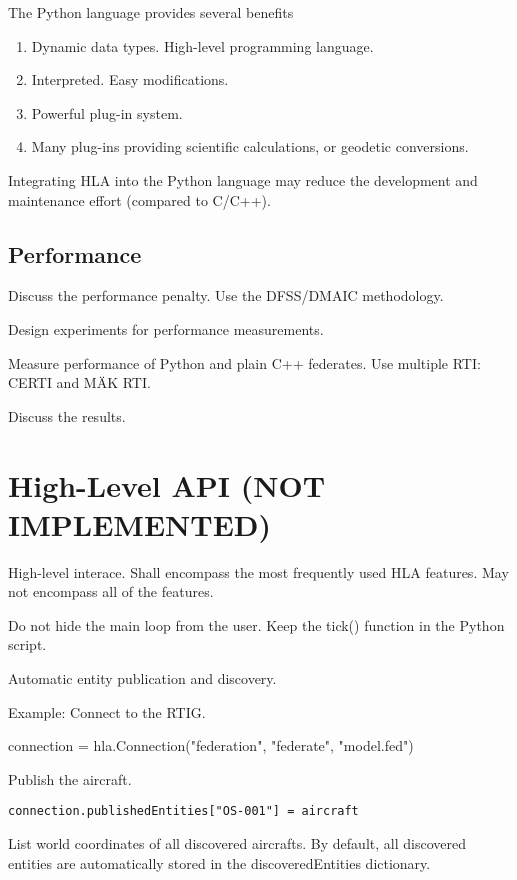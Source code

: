 \documentclass{howto}
\begin{document}
The Python language provides several benefits
\begin{enumerate}
\item Dynamic data types. High-level programming language.
\item Interpreted. Easy modifications.
\item Powerful plug-in system.
\item Many plug-ins providing scientific calculations, or geodetic conversions.
\end{enumerate}

Integrating HLA into the Python language may reduce the development and
maintenance effort (compared to C/C++).

\subsection{Performance}

Discuss the performance penalty. Use the DFSS/DMAIC methodology.

Design experiments for performance measurements.

Measure performance of Python and plain C++ federates. Use multiple RTI: CERTI and MÄK RTI.

Discuss the results.




\section{High-Level API (NOT IMPLEMENTED)}
High-level interace. Shall encompass the most frequently used HLA features. May not encompass all of the features.

Do not hide the main loop from the user. Keep the tick() function in the Python script.

Automatic entity publication and discovery.

Example:
Connect to the RTIG.

connection = hla.Connection("federation", "federate", "model.fed")

Publish the aircraft.

\begin{verbatim}
connection.publishedEntities["OS-001"] = aircraft
\end{verbatim}

List world coordinates of all discovered aircrafts. By default, all discovered
entities are automatically stored in the discoveredEntities dictionary.
\end{document}
